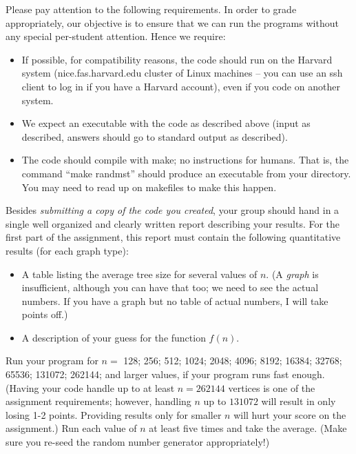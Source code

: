 \documentclass[11pt]{article}
\begin{document}
Please pay attention to the following requirements.  In order to grade
appropriately, our objective is to ensure that we can run the programs
without any special per-student attention.  Hence we require:
\begin{itemize}
\item If possible, for compatibility reasons, the code should run on the Harvard system (nice.fas.harvard.edu cluster of Linux machines -- you can use an ssh client to log in if you have a Harvard account), even if you code on another system.
\item We expect an executable with the code as described above
(input as described, answers should go to standard output as described).
\item The code should compile with make; no instructions for humans.  That is,
the command ``make randmst'' should produce an executable from your directory.
You may need to read up on makefiles to make this happen.
\end{itemize}

Besides {\em submitting a copy of the code you created},
your group should hand in a single well organized and clearly written
report describing your results.  For the first part of the assignment,
this report must contain the following quantitative results (for each
graph type):
\begin{itemize}
\item A table listing the average tree size for several values of $n$.
(A {\em graph} is insufficient, although you can have that too;  we need to see the actual numbers.  If you have a graph but no table of actual numbers, I will take points off.)
\item A description of your guess for the function $f(n)$.
\end{itemize}
Run your program for $n =$
128; 256; 512; 1024; 2048; 4096; 8192; 16384; 32768; 65536; 131072; 262144; and larger values, if your
program runs fast enough.  (Having your code handle up to at least $n = 262144$ vertices is
one of the assignment requirements;  however, 
handling $n$ up to $131072$ will result in only losing 1-2 points. 
Providing results only for smaller $n$ will hurt your score
on the assignment.) Run each value of $n$ at least five times and
take the average.  (Make sure you re-seed the random number generator
appropriately!)
\end{document}
